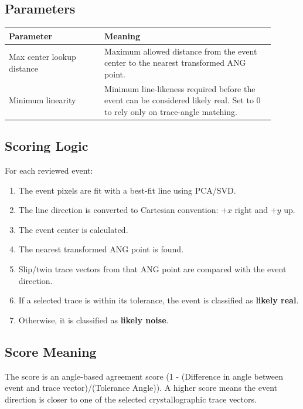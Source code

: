 \documentclass[11pt]{article}
\newcommand{\ui}[1]{\textbf{#1}}
\begin{document}
\subsection{Parameters}

\begin{longtable}{p{0.32\linewidth}p{0.58\linewidth}}
\toprule
\textbf{Parameter} & \textbf{Meaning} \\
\midrule
Max center lookup distance & Maximum allowed distance from the event center to the nearest transformed ANG point. \\
Minimum linearity & Minimum line-likeness required before the event can be considered likely real. Set to 0 to rely only on trace-angle matching. \\
\bottomrule
\end{longtable}

\subsection{Scoring Logic}

For each reviewed event:

\begin{enumerate}
    \item The event pixels are fit with a best-fit line using PCA/SVD.
    \item The line direction is converted to Cartesian convention: \(+x\) right and \(+y\) up.
    \item The event center is calculated.
    \item The nearest transformed ANG point is found.
    \item Slip/twin trace vectors from that ANG point are compared with the event direction.
    \item If a selected trace is within its tolerance, the event is classified as \ui{likely real}.
    \item Otherwise, it is classified as \ui{likely noise}.
\end{enumerate}

\subsection{Score Meaning}

The score is an angle-based agreement score (1 - (Difference in angle between event and trace vector)/(Tolerance Angle)). A higher score means the event direction is closer to one of the selected crystallographic trace vectors.
\end{document}
